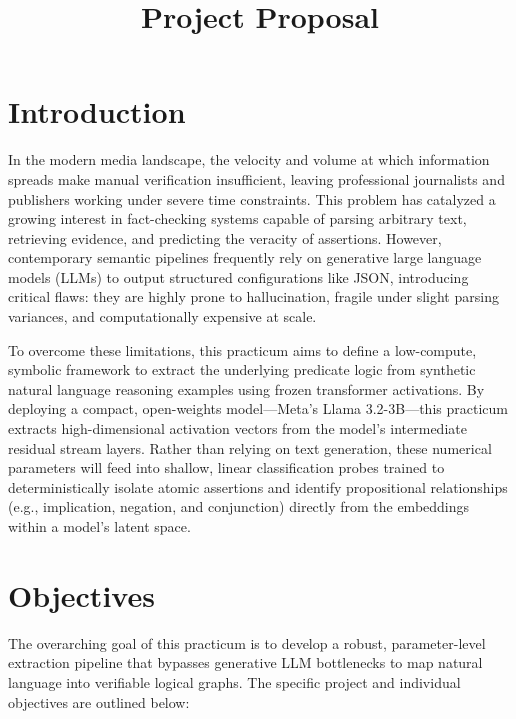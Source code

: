 \documentclass[12 pt]{article}  %
\title{Project Proposal}
\begin{document}

\tableofcontents
\listoftables
\newpage
{}

\section{Introduction}

In the modern media landscape, the velocity and volume at which information spreads make manual verification insufficient, leaving professional journalists and publishers working under severe time constraints. This problem has catalyzed a growing interest in fact-checking systems capable of parsing arbitrary text, retrieving evidence, and predicting the veracity of assertions. 
\cite{cheng2025empoweringllmslogicalreasoning}
\cite{guo2022surveyautomatedfactchecking}
However, contemporary semantic pipelines frequently rely on generative large language models (LLMs) to output structured configurations like JSON, introducing critical flaws: they are highly prone to hallucination, 
fragile under slight parsing variances, and computationally expensive at scale.
\cite{jin2022logicalfallacydetection}
\cite{lalwani2025autoformalizingnaturallanguagefirstorder}
\cite{yang2023couplinglargelanguagemodels}

To overcome these limitations, this practicum aims to define a low-compute, symbolic framework to extract the underlying predicate logic from synthetic natural language reasoning examples using frozen transformer activations. By deploying a compact, open-weights model---Meta's Llama 3.2-3B---this practicum extracts high-dimensional activation vectors from the model's intermediate residual stream layers. Rather than relying on text generation, these numerical parameters will feed into shallow, linear classification probes trained to deterministically isolate atomic assertions and identify propositional relationships (e.g., implication, negation, and conjunction) directly from the embeddings within a model's latent space.
\cite{alain2018understandingintermediatelayersusing} 
\cite{marks2024geometrytruthemergentlinear}

\newpage
\section{Objectives}
The overarching goal of this practicum is to develop a robust, parameter-level extraction pipeline that bypasses generative LLM bottlenecks to map natural language into verifiable logical graphs. The specific project and individual objectives are outlined below:
\end{document}
